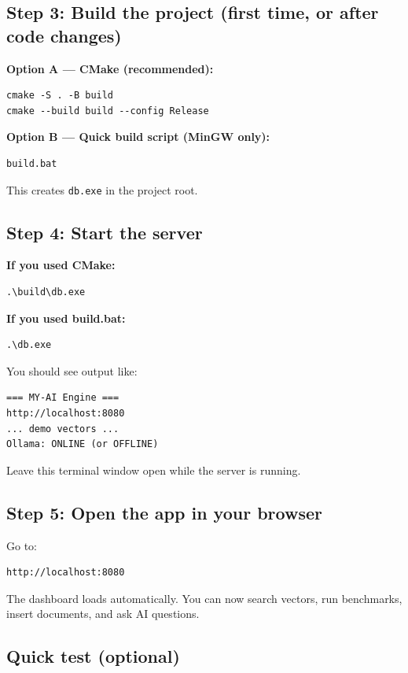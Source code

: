 \documentclass[11pt]{article}
\begin{document}
\subsection*{Step 3: Build the project (first time, or after code changes)}

\textbf{Option A --- CMake (recommended):}
\begin{lstlisting}
cmake -S . -B build
cmake --build build --config Release
\end{lstlisting}

\textbf{Option B --- Quick build script (MinGW only):}
\begin{lstlisting}
build.bat
\end{lstlisting}
This creates \texttt{db.exe} in the project root.

\subsection*{Step 4: Start the server}

\textbf{If you used CMake:}
\begin{lstlisting}
.\build\db.exe
\end{lstlisting}

\textbf{If you used build.bat:}
\begin{lstlisting}
.\db.exe
\end{lstlisting}

You should see output like:
\begin{lstlisting}
=== MY-AI Engine ===
http://localhost:8080
... demo vectors ...
Ollama: ONLINE (or OFFLINE)
\end{lstlisting}

Leave this terminal window open while the server is running.

\subsection*{Step 5: Open the app in your browser}

Go to:
\begin{lstlisting}
http://localhost:8080
\end{lstlisting}

The dashboard loads automatically. You can now search vectors, run benchmarks, insert documents, and ask AI questions.

\subsection*{Quick test (optional)}
\end{document}
